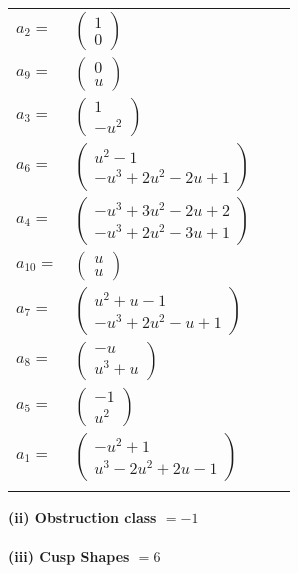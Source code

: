 \documentclass[1p]{elsarticle_modified}
\theoremstyle{definition}
\begin{document}
\begin{tabular}{m{7pt} m{180pt} m{7pt} m{180pt} }
\flushright $a_{2}=$&$\begin{pmatrix}1\\0\end{pmatrix}$ \\
\flushright $a_{9}=$&$\begin{pmatrix}0\\u\end{pmatrix}$ \\
\flushright $a_{3}=$&$\begin{pmatrix}1\\- u^2\end{pmatrix}$ \\
\flushright $a_{6}=$&$\begin{pmatrix}u^2-1\\- u^3+2 u^2-2 u+1\end{pmatrix}$ \\
\flushright $a_{4}=$&$\begin{pmatrix}- u^3+3 u^2-2 u+2\\- u^3+2 u^2-3 u+1\end{pmatrix}$ \\
\flushright $a_{10}=$&$\begin{pmatrix}u\\u\end{pmatrix}$ \\
\flushright $a_{7}=$&$\begin{pmatrix}u^2+u-1\\- u^3+2 u^2- u+1\end{pmatrix}$ \\
\flushright $a_{8}=$&$\begin{pmatrix}- u\\u^3+u\end{pmatrix}$ \\
\flushright $a_{5}=$&$\begin{pmatrix}-1\\u^2\end{pmatrix}$ \\
\flushright $a_{1}=$&$\begin{pmatrix}- u^2+1\\u^3-2 u^2+2 u-1\end{pmatrix}$\\&\end{tabular}
\flushleft \textbf{(ii) Obstruction class $= -1$}\\~\\
\flushleft \textbf{(iii) Cusp Shapes $= 6$}\\~\\
\end{document}
